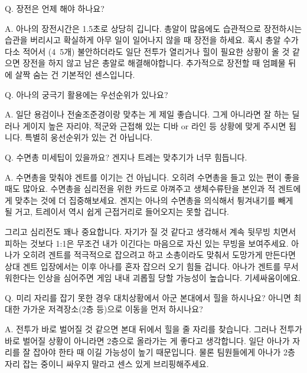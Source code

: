  

 

Q. 장전은 언제 해야 하나요?

 

A. 아나의 장전시간은 1.5초로 상당히 깁니다. 총알이 많음에도 습관적으로 장전하시는 습관을 버리시고 확실하게 아무 일이 일어나지 않을 때 장전을 하세요. 혹시 총알 수가 다소 적어서 (4~5개) 불안하더라도 일단 전투가 열리거나 힐이 필요한 상황이 올 것 같으면 장전을 하지 않고 남은 총알로 해결해야합니다. 추가적으로 장전할 때 엄폐물 뒤에 살짝 숨는 건 기본적인 센스입니다.

 

 

Q. 아나의 궁극기 활용에는 우선순위가 있나요?

 

A. 일단 용검이나 전술조준경이랑 맞추는 게 제일 좋습니다. 그게 아니라면 잘 하는 딜러나 게이지 높은 자리야, 적군와 근접해 있는 디바 or 라인 등 상황에 맞게 주시면 됩니다. 특별히 웅선순위가 있는 건 아닙니다.

 

 

Q. 수면총 미세팁이 있을까요? 겐지나 트레는 맞추기가 너무 힘듭니다.

 

A. 수면총을 맞춰야 겐트를 이기는 건 아닙니다. 오히려 수면총을 들고 있는 편이 좋을 때도 많아요. 수면총을 심리전을 위한 카드로 아껴주고 생체수류탄을 본인과 적 겐트에게 맞추는 것에 더 집중해보세요. 겐지는 아나의 수면총을 의식해서 튕겨내기를 빼게 될 거고, 트레이서 역시 쉽게 근접거리로 들어오지는 못할 겁니다.

 

그리고 심리전도 꽤나 중요합니다. 자기가 질 것 같다고 생각해서 계속 뒷무빙 치면서 피하는 것보다 1:1은 무조건 내가 이긴다는 마음으로 자신 있는 무빙을 보여주세요. 아나가 오히려 겐트를 적극적으로 잡으려고 하고 소총이라도 맞춰서 도망가게 만든다면 상대 겐트 입장에서는 이후 아나를 혼자 잡으러 오기 힘들 겁니다. 아나가 겐트를 무서워한다는 인상을 심어주면 게임 내내 괴롭힐 당할 가능성이 높습니다. 기세싸움이에요.

 

 

Q. 미리 자리를 잡기 못한 경우 대치상황에서 아군 본대에서 힐을 하시나요? 아니면 최대한 가가운 저격장소(2층 등)으로 이동을 먼저 하시나요?

 

A. 전투가 바로 벌어질 것 같으면 본대 뒤에서 힐을 줄 자리를 찾습니다. 그러나 전투가 바로 벌어질 상황이 아니라면 2층으로 올라가는 게 좋다고 생각합니다. 일단 아나가 자리를 잘 잡아야 한타 때 이길 가능성이 높기 때문입니다. 물론 팀원들에게 아나가 2층 자리 잡는 중이니 싸우지 말라고 센스 있게 브리핑해주세요.


